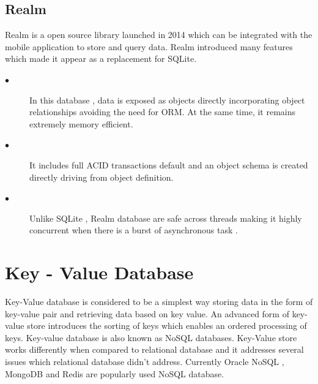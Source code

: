 \subsection{Realm}

		Realm is a open source library launched in 2014 which can be integrated with the mobile application to store and query data. Realm introduced many features which made it appear as a replacement for SQLite.  

\begin{description}
  \item[$\bullet$] In this database , data is exposed as objects directly incorporating object relationships avoiding the need for ORM. At the same time, it remains extremely memory efficient. 
   \item[$\bullet$] It includes full ACID transactions default and an object schema is created directly driving from object definition.
   \item[$\bullet$] Unlike SQLite , Realm database are safe across threads making it highly concurrent when there is a burst of asynchronous task .  
\end{description}  


\section{Key - Value Database}

			Key-Value database is considered to be a simplest way storing data in the form of key-value pair and retrieving data based on key value. An advanced form of key-value store introduces the sorting of keys which enables an ordered processing of keys. Key-value database is also known as NoSQL databases. Key-Value store works differently when compared to relational database and it addresses several issues which relational database didn't address. Currently Oracle NoSQL , MongoDB and Redis are popularly used NoSQL database.  

